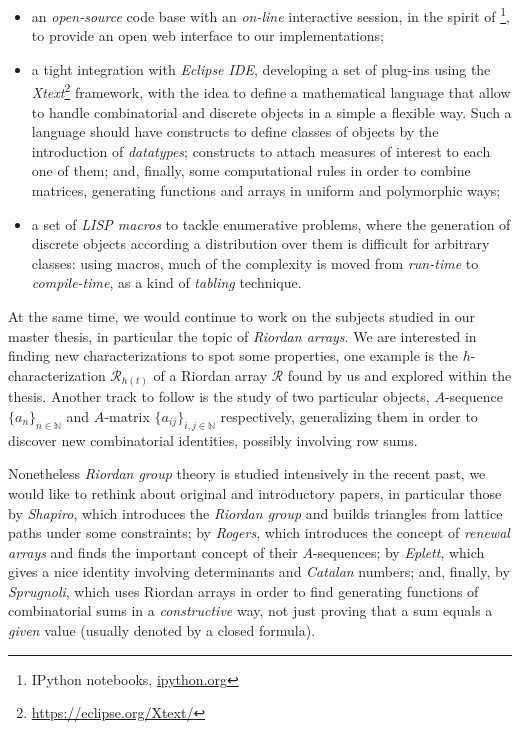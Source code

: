 \begin{itemize} 

    \item an \emph{open-source} code base with an \emph{on-line} interactive
    session, in the spirit of \footnote{IPython notebooks, \url{ipython.org}},
    to provide an open web interface to our implementations; 

    \item a tight integration with \emph{Eclipse IDE}, developing a set of
    plug-ins using the \emph{Xtext}\footnote{\url{https://eclipse.org/Xtext/}}
    framework, with the idea to define a mathematical language that allow to
    handle combinatorial and discrete objects in a simple a flexible way. Such
    a language should have constructs to define classes of objects by the
    introduction of \emph{datatypes}; constructs to attach measures of interest
    to each one of them; and, finally, some computational rules in order to
    combine matrices, generating functions and arrays in uniform and
    polymorphic ways; 

    \item a set of \emph{LISP macros} to tackle enumerative problems, where the
    generation of discrete objects according a distribution over them is
    difficult for arbitrary classes: using macros, much of the complexity is
    moved from \emph{run-time} to \emph{compile-time}, as a kind of
    \emph{tabling} technique.

\end{itemize}

At the same time, we would continue to work on the subjects studied in our
master thesis, in particular the topic of \emph{Riordan arrays}. We are
interested in finding new characterizations to spot some properties, one
example is the $h$-characterization $\mathcal{R}_{h(t)}$ of a Riordan array
$\mathcal{R}$ found by us and explored within the thesis.  Another track to
follow is the study of two particular objects, $A$-sequence $\lbrace
a_{n}\rbrace_{n\in\mathbb{N}}$ and $A$-matrix $\lbrace
a_{ij}\rbrace_{i,j\in\mathbb{N}}$ respectively, generalizing them in order to
discover new combinatorial identities, possibly involving row sums.

Nonetheless \emph{Riordan group} theory is studied intensively in the recent past, we would like
to rethink about original and introductory papers, in particular those by
\emph{Shapiro}, which introduces the \emph{Riordan group} and builds triangles
from lattice paths under some constraints; by \emph{Rogers}, which introduces
the concept of \emph{renewal arrays} and finds the important concept of their
$A$-sequences; by \emph{Eplett}, which gives a nice identity involving
determinants and \emph{Catalan} numbers; and, finally, by \emph{Sprugnoli},
which uses Riordan arrays in order to find generating functions of
combinatorial sums in a \emph{constructive} way, not just proving that a sum
equals a \emph{given} value (usually denoted by a closed formula). 

